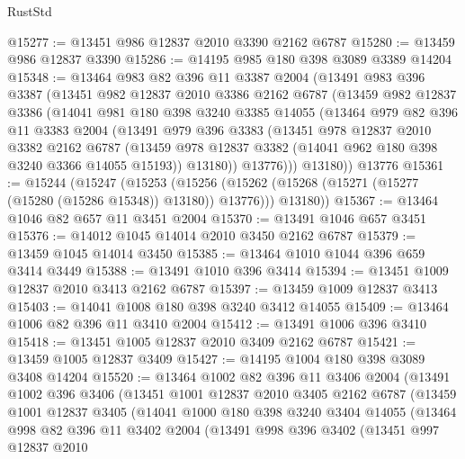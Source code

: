 \begin{lexlean}{RustStd}
\begin{coremodule}
@15277 := @13451 @986 @12837 @2010 @3390 @2162 @6787
@15280 := @13459 @986 @12837 @3390
@15286 := @14195 @985 @180 @398 @3089 @3389 @14204
@15348 := @13464
    @983
    @82
    @396
    @11
    @3387
    @2004
    (@13491
      @983
      @396
      @3387
      (@13451
        @982
        @12837
        @2010
        @3386
        @2162
        @6787
        (@13459
          @982
          @12837
          @3386
          (@14041
            @981
            @180
            @398
            @3240
            @3385
            @14055
            (@13464
              @979
              @82
              @396
              @11
              @3383
              @2004
              (@13491
                @979
                @396
                @3383
                (@13451
                  @978
                  @12837
                  @2010
                  @3382
                  @2162
                  @6787
                  (@13459 @978 @12837 @3382 (@14041 @962 @180 @398 @3240 @3366 @14055 @15193))
                  @13180))
              @13776)))
        @13180))
    @13776
@15361 := @15244
    (@15247
      (@15253
        (@15256 (@15262 (@15268 (@15271 (@15277 (@15280 (@15286 @15348)) @13180)) @13776)))
        @13180))
@15367 := @13464 @1046 @82 @657 @11 @3451 @2004
@15370 := @13491 @1046 @657 @3451
@15376 := @14012 @1045 @14014 @2010 @3450 @2162 @6787
@15379 := @13459 @1045 @14014 @3450
@15385 := @13464 @1010 @1044 @396 @659 @3414 @3449
@15388 := @13491 @1010 @396 @3414
@15394 := @13451 @1009 @12837 @2010 @3413 @2162 @6787
@15397 := @13459 @1009 @12837 @3413
@15403 := @14041 @1008 @180 @398 @3240 @3412 @14055
@15409 := @13464 @1006 @82 @396 @11 @3410 @2004
@15412 := @13491 @1006 @396 @3410
@15418 := @13451 @1005 @12837 @2010 @3409 @2162 @6787
@15421 := @13459 @1005 @12837 @3409
@15427 := @14195 @1004 @180 @398 @3089 @3408 @14204
@15520 := @13464
    @1002
    @82
    @396
    @11
    @3406
    @2004
    (@13491
      @1002
      @396
      @3406
      (@13451
        @1001
        @12837
        @2010
        @3405
        @2162
        @6787
        (@13459
          @1001
          @12837
          @3405
          (@14041
            @1000
            @180
            @398
            @3240
            @3404
            @14055
            (@13464
              @998
              @82
              @396
              @11
              @3402
              @2004
              (@13491
                @998
                @396
                @3402
                (@13451
                  @997
                  @12837
                  @2010

\end{coremodule}
\end{lexlean}
